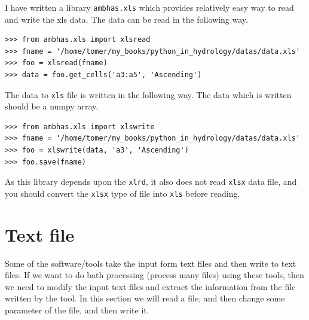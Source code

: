 \documentclass[10pt]{book}
\begin{document}
I have written a library \verb"ambhas.xls" which provides relatively easy way to read and write the xls data. The data can be read in the following way. 
\beforeverb \begin{verbatim}
>>> from ambhas.xls import xlsread
>>> fname = '/home/tomer/my_books/python_in_hydrology/datas/data.xls'
>>> foo = xlsread(fname)
>>> data = foo.get_cells('a3:a5', 'Ascending')
\end{verbatim} \afterverb

The data to \verb"xls" file is written in the following way. The data which is written should be a numpy array.
\beforeverb \begin{verbatim}
>>> from ambhas.xls import xlswrite
>>> fname = '/home/tomer/my_books/python_in_hydrology/datas/data.xls'
>>> foo = xlswrite(data, 'a3', 'Ascending')
>>> foo.save(fname)
\end{verbatim} \afterverb
As this library depends upon the \verb"xlrd", it also does not read \verb"xlsx" data file, and you should convert the \verb"xlsx" type of file into \verb"xls" before reading.

\section{Text file}
Some of the software/tools take the input form text files and then write to text files. If we want to do bath processing (process many files) using these tools, then we need to modify the input text files and extract the information from the file written by the tool. In this section we will read a file, and then change some parameter of the file, and then write it.\\
\end{document}
